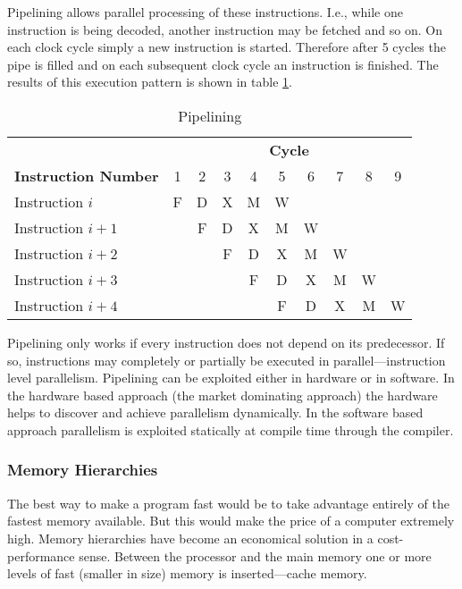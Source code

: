 Pipelining allows parallel processing of these
instructions. I.e., while one instruction is being decoded, another
instruction may be fetched and so on. On each clock cycle simply a new
instruction is started. Therefore after 5 cycles the pipe is filled
and on each subsequent clock cycle an instruction is finished. The
results of this execution pattern is shown in table
\ref{tab:pipelining}.

\begin{table}[h!b!p!]
\caption{Pipelining}
\centering
\begin{tabular}{|l|c|c|c|c|c|c|c|c|c|}
\hline
 & \multicolumn{9}{|c|}{\textbf{Cycle}} \\
\textbf{Instruction Number}
	& 1
	& 2
	& 3
	& 4
	& 5
	& 6
	& 7
	& 8
	& 9
        \\ \hline 
Instruction $i$   & F & D & X & M & W &   &   &   &   \\ \hline
Instruction $i+1$ &   & F & D & X & M & W &   &   &   \\ \hline
Instruction $i+2$ &   &   & F & D & X & M & W &   &   \\ \hline
Instruction $i+3$ &   &   &   & F & D & X & M & W &   \\ \hline
Instruction $i+4$ &   &   &   &   & F & D & X & M & W \\ \hline
\end{tabular}
\label{tab:pipelining}
\end{table}

Pipelining only works if every instruction does not depend on its
predecessor. If so, instructions may completely or partially be executed
in parallel---instruction level parallelism.
Pipelining can be
exploited either in hardware or in software. In the hardware based
approach (the market dominating approach) the hardware helps to
discover and achieve parallelism dynamically. In the software based
approach parallelism is exploited statically at compile time through the
compiler. 

\subsubsection{Memory Hierarchies}

The best way to
make a program fast would be to take advantage entirely of the fastest memory
available. But this would make the price of a computer extremely
high. Memory hierarchies have become an economical solution in a
cost-performance sense. Between the processor and the main memory one
or more levels of fast (smaller in size) memory is inserted---cache
memory.

